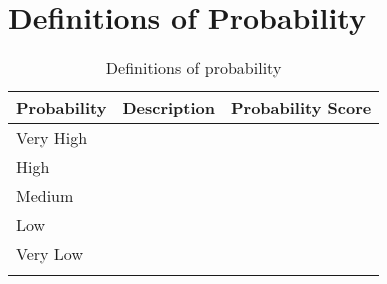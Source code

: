 \section{Definitions of Probability}

\begin{longtable}[H]{l >{\raggedright\arraybackslash}p{7.8cm} p{4cm}}
	
	\toprule[2pt]
	
	\textbf{Probability} &  \textbf{Description}  & \textbf{Probability Score} \\
	
	\midrule [1.5pt]
	\endhead
	
	Very High &  & 
	\vspace{0.2cm} \\
	
	\midrule
	
	High &  & 
	\vspace{0.2cm} \\
	
	\midrule
	
	Medium &  & 
	\vspace{0.2cm} \\

	\midrule

	Low &  & 
	\vspace{0.2cm} \\

	\midrule

	Very Low &  & 
	\vspace{0.2cm} \\
		
	\bottomrule[2pt]
	
	\caption{Definitions of probability}

\end{longtable}